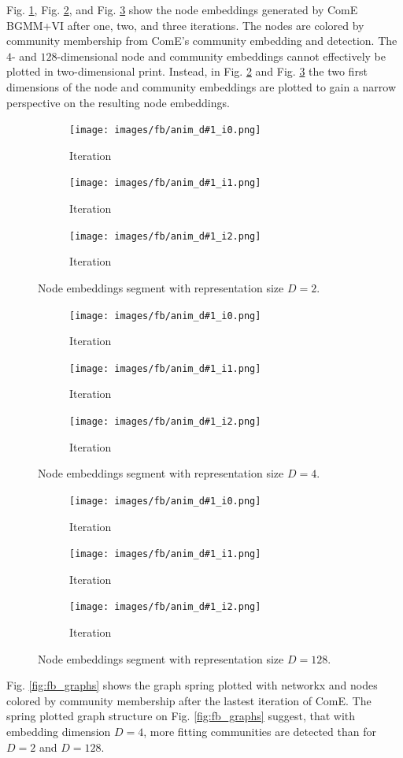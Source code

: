\documentclass[conference]{IEEEtran}
\begin{document}
Fig. \ref{fig:fb_emb_anim_d2}, Fig. \ref{fig:fb_emb_anim_d4}, and Fig. \ref{fig:fb_emb_anim_d128} show the node embeddings generated by ComE BGMM+VI after one, two, and three iterations. The nodes are colored by community membership from ComE's community embedding and detection.
The $4$- and $128$-dimensional node and community embeddings cannot effectively be plotted in two-dimensional print. Instead, in Fig. \ref{fig:fb_emb_anim_d4} and Fig. \ref{fig:fb_emb_anim_d128} the two first dimensions of the node and community embeddings are plotted to gain a narrow perspective on the resulting node embeddings.

\newcommand{\fbEmbAnimD}[1]{
    \begin{figure}[htbp]
        \centering
        \begin{subfigure}{.33\textwidth}
            \centering
            \texttt{[image: images/fb/anim\_d\#1\_i0.png]}
            \caption{\nth{1} Iteration}
        \end{subfigure}%
        \begin{subfigure}{.33\textwidth}
            \centering
            \texttt{[image: images/fb/anim\_d\#1\_i1.png]}
            \caption{\nth{2} Iteration}
        \end{subfigure}%
        \begin{subfigure}{.33\textwidth}
            \centering
            \texttt{[image: images/fb/anim\_d\#1\_i2.png]}
            \caption{\nth{3} Iteration}
        \end{subfigure}%
        \caption{Node embeddings segment with representation size $D=#1$.}
        \label{fig:fb_emb_anim_d#1}
    \end{figure}
}

\fbEmbAnimD{2}
\fbEmbAnimD{4}
\fbEmbAnimD{128}

Fig. \ref{fig:fb_graphs} shows the graph spring plotted with networkx and nodes colored by community membership after the lastest iteration of ComE.\cite{networkx} The spring plotted graph structure on Fig. \ref{fig:fb_graphs} suggest, that with embedding dimension $D=4$, more fitting communities are detected than for $D=2$ and $D=128$.
\end{document}
